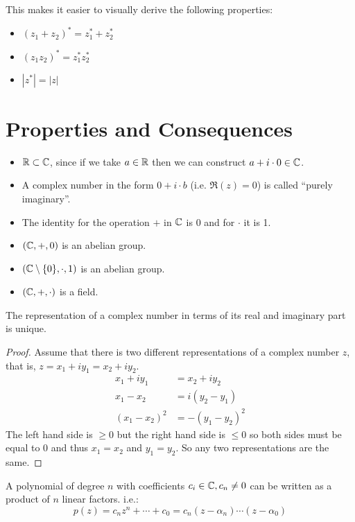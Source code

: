 \documentclass[../main.tex]{subfiles}
\begin{document}
This makes it easier to visually derive the following properties:
\begin{itemize}
  \item $(z_1 + z_2)^{*} = z^{*}_{1} + z^{*}_{2}$
  \item $(z_1 z_2)^{*} = z^{*}_{1} z^{*}_{2}$
  \item $|z^{*}| = |z|$
\end{itemize}

\section{Properties and Consequences}
\begin{remark}
  \begin{itemize}
    \item $\mathbb{R} \subset \mathbb{C}$, since if we take $a \in \mathbb{R}$ then we can construct $a + i \cdot 0 \in \mathbb{C}$.
    \item A complex number in the form $0 + i \cdot b$ (i.e. $\Re(z) = 0$) is called ``purely imaginary''.
    \item The identity for the operation $+$ in $\mathbb{C}$ is 0 and for $\cdot$ it is 1.
    \item $(\mathbb{C}, +, 0)$ is an abelian group.
    \item $(\mathbb{C} \setminus \{0\}, \cdot, 1)$ is an abelian group.
    \item $(\mathbb{C}, +, \cdot)$ is a field.
  \end{itemize}
\end{remark}
\begin{proposition}
  The representation of a complex number in terms of its real and imaginary part is unique.
\end{proposition}
\begin{proof}
  Assume that there is two different representations of a complex number $z$, that is, $z = x_1 + iy_1 = x_2 + iy_2$.
  \begin{align*}
    x_1 + iy_1 &= x_2 + iy_2 \\
    x_1 - x_2 &= i(y_2 - y_1) \\
    (x_1 - x_2)^2 &= -(y_1 - y_2)^2
  \end{align*}
  The left hand side is $\geq 0$ but the right hand side is $\leq 0$ so both sides must be equal to 0 and thus $x_1 = x_2$ and $y_1 = y_2$.
  So any two representations are the same.
\end{proof}
\begin{theorem}
  A polynomial of degree $n$ with coefficients $c_i \in \mathbb{C}, c_n \neq 0$ can be written as a product of $n$ linear factors. i.e.:
  \[
    p(z) = c_n z^n + \cdots + c_0 = c_n(z - \alpha_n) \cdots (z - \alpha_0)
  \]
\end{theorem}
\end{document}

